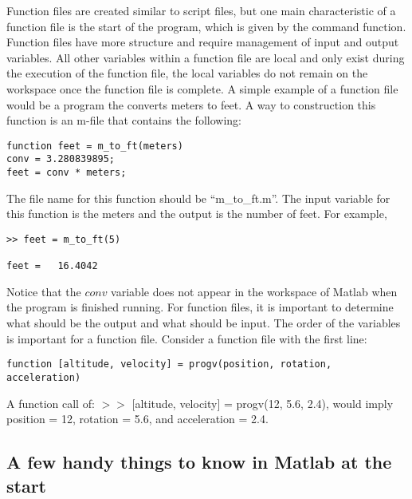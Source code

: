 \documentclass[twoside]{article}
\begin{document}
Function files are created similar to script files, but one main characteristic of a function file is the start of the program, which is given by the command {\color{blue}function}.  Function files have more structure and require management of input and output variables. All other variables within a function file are local and only exist during the execution of the function file, the local variables do not remain on the workspace once the function file is complete. A simple example of a function file would be a program the converts meters to feet.  A way to construction this function is an m-file that contains the following:
\begin{verbatim}
function feet = m_to_ft(meters)
conv = 3.280839895;
feet = conv * meters;
\end{verbatim}
The file name for this function should be ``m\_to\_ft.m''. The input variable for this function is the meters and the output is the number of feet. For example,
\begin{verbatim}
>> feet = m_to_ft(5)

feet =   16.4042
\end{verbatim}
Notice that the $conv$ variable does not appear in the workspace of Matlab when the program is finished running. For function files, it is important to determine what should be the output and what should be input. The order of the variables is important for a function file. Consider a function file with the first line:
\begin{verbatim}
function [altitude, velocity] = progv(position, rotation, acceleration)
\end{verbatim}
A function call of:  $>>$ [altitude, velocity] = progv(12, 5.6, 2.4), would imply position = 12, rotation = 5.6, and acceleration = 2.4. 

\subsection{A few handy things to know in Matlab at the start}
\end{document}
